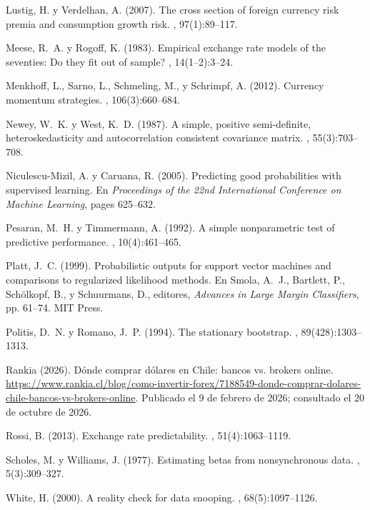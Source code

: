 \documentclass[11pt,a4paper]{article}
\begin{document}
\begin{thebibliography}{}
Lustig, H. y Verdelhan, A. (2007).
\newblock The cross section of foreign currency risk premia and consumption
  growth risk.
, 97(1):89--117.

Meese, R.~A. y Rogoff, K. (1983).
\newblock Empirical exchange rate models of the seventies: Do they fit out of
  sample?
, 14(1--2):3--24.

Menkhoff, L., Sarno, L., Schmeling, M., y Schrimpf, A. (2012).
\newblock Currency momentum strategies.
, 106(3):660--684.

Newey, W.~K. y West, K.~D. (1987).
\newblock A simple, positive semi-definite, heteroskedasticity and
  autocorrelation consistent covariance matrix.
, 55(3):703--708.

Niculescu-Mizil, A. y Caruana, R. (2005).
\newblock Predicting good probabilities with supervised learning.
\newblock En {\em Proceedings of the 22nd International Conference on Machine
  Learning}, pages 625--632.

Pesaran, M.~H. y Timmermann, A. (1992).
\newblock A simple nonparametric test of predictive performance.
, 10(4):461--465.

Platt, J.~C. (1999).
\newblock Probabilistic outputs for support vector machines and comparisons to
  regularized likelihood methods.
\newblock En Smola, A.~J., Bartlett, P., Schölkopf, B., y Schuurmans, D.,
  editores, {\em Advances in Large Margin Classifiers}, pp. 61--74. MIT Press.

Politis, D.~N. y Romano, J.~P. (1994).
\newblock The stationary bootstrap.
,
  89(428):1303--1313.

{Rankia} (2026).
\newblock Dónde comprar dólares en {C}hile: bancos vs. brokers online.
\newblock \url{https://www.rankia.cl/blog/como-invertir-forex/7188549-donde-comprar-dolares-chile-bancos-vs-brokers-online}. Publicado el 9 de febrero de 2026; consultado el 20 de octubre de 2026.

Rossi, B. (2013).
\newblock Exchange rate predictability.
, 51(4):1063--1119.

Scholes, M. y Williams, J. (1977).
\newblock Estimating betas from nonsynchronous data.
, 5(3):309--327.

White, H. (2000).
\newblock A reality check for data snooping.
, 68(5):1097--1126.

\end{thebibliography}
\end{document}
